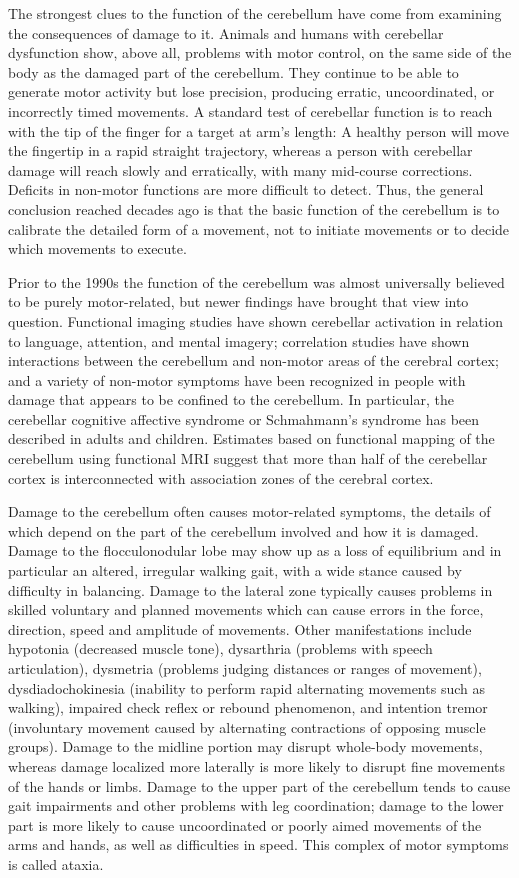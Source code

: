 The strongest clues to the function of the cerebellum have come from examining the consequences of damage to it. Animals and humans with cerebellar dysfunction show, above all, problems with motor control, on the same side of the body as the damaged part of the cerebellum. They continue to be able to generate motor activity but lose precision, producing erratic, uncoordinated, or incorrectly timed movements. A standard test of cerebellar function is to reach with the tip of the finger for a target at arm's length: A healthy person will move the fingertip in a rapid straight trajectory, whereas a person with cerebellar damage will reach slowly and erratically, with many mid-course corrections. Deficits in non-motor functions are more difficult to detect. Thus, the general conclusion reached decades ago is that the basic function of the cerebellum is to calibrate the detailed form of a movement, not to initiate movements or to decide which movements to execute.

Prior to the 1990s the function of the cerebellum was almost universally believed to be purely motor-related, but newer findings have brought that view into question. Functional imaging studies have shown cerebellar activation in relation to language, attention, and mental imagery; correlation studies have shown interactions between the cerebellum and non-motor areas of the cerebral cortex; and a variety of non-motor symptoms have been recognized in people with damage that appears to be confined to the cerebellum. In particular, the cerebellar cognitive affective syndrome or Schmahmann's syndrome has been described in adults and children. Estimates based on functional mapping of the cerebellum using functional MRI suggest that more than half of the cerebellar cortex is interconnected with association zones of the cerebral cortex.

Damage to the cerebellum often causes motor-related symptoms, the details of which depend on the part of the cerebellum involved and how it is damaged. Damage to the flocculonodular lobe may show up as a loss of equilibrium and in particular an altered, irregular walking gait, with a wide stance caused by difficulty in balancing. Damage to the lateral zone typically causes problems in skilled voluntary and planned movements which can cause errors in the force, direction, speed and amplitude of movements. Other manifestations include hypotonia (decreased muscle tone), dysarthria (problems with speech articulation), dysmetria (problems judging distances or ranges of movement), dysdiadochokinesia (inability to perform rapid alternating movements such as walking), impaired check reflex or rebound phenomenon, and intention tremor (involuntary movement caused by alternating contractions of opposing muscle groups). Damage to the midline portion may disrupt whole-body movements, whereas damage localized more laterally is more likely to disrupt fine movements of the hands or limbs. Damage to the upper part of the cerebellum tends to cause gait impairments and other problems with leg coordination; damage to the lower part is more likely to cause uncoordinated or poorly aimed movements of the arms and hands, as well as difficulties in speed. This complex of motor symptoms is called ataxia.


